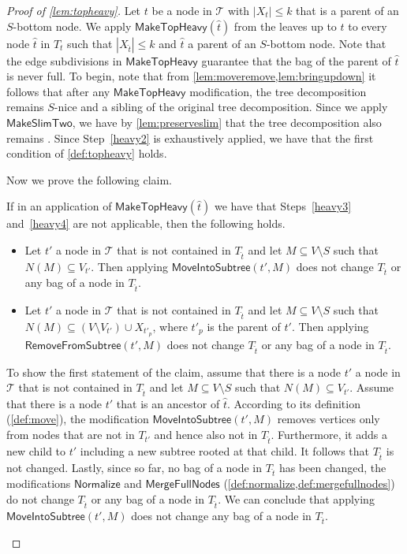 \documentclass[a4paper,UKenglish,cleveref, autoref, thm-restate, numberwithinsect]{lipics-v2021}
\newcounter{modification}
\newcommand{\slim}{\text{slim}\xspace}
\newcommand{\Normalize}{\mathsf{Normalize}}
\newcommand{\MoveIntoSubtree}{\mathsf{MoveIntoSubtree}}
\newcommand{\RemoveFromSubtree}{\mathsf{RemoveFromSubtree}}
\newcommand{\MergeFullNodes}{\mathsf{MergeFullNodes}}
\newcommand{\MakeSlimTwo}{\mathsf{MakeSlimTwo}}
\newcommand{\MakeTopHeavy}{\mathsf{MakeTopHeavy}}
\begin{document}
\begin{proof}[Proof of \cref{lem:topheavy}]
Let $t$ be a node in $\mathcal{T}$ with $|X_t|\le k$ that is a parent of an $S$-bottom node.
We apply $\MakeTopHeavy(\hat{t})$ from the leaves up to $t$ to every node $\hat{t}$ in $T_t$ such that $|X_{\hat{t}}|\le k$ and $\hat{t}$ a parent of an $S$-bottom node. 
Note that the edge subdivisions in $\MakeTopHeavy$ guarantee that the bag of the parent of $\hat{t}$ is never full.
To begin, note that from \cref{lem:moveremove,lem:bringupdown} it follows that after any $\MakeTopHeavy$ modification, the tree decomposition remains $S$-nice and a sibling of the original tree decomposition. Since we apply $\MakeSlimTwo$, we have by \cref{lem:preserveslim} that the tree decomposition also remains \slim. 
Since Step~\ref{heavy2} is exhaustively applied, we have that the first condition of \cref{def:topheavy} holds.

Now we prove the following claim.
\begin{claim}
If in an application of $\MakeTopHeavy(\hat{t})$ 
we have that Steps~\ref{heavy3} and~\ref{heavy4} are not applicable, then the following holds.
\begin{itemize}
\item Let $t'$ a node in $\mathcal{T}$ that is not contained in $T_{\hat{t}}$ and let $M\subseteq V\setminus S$ such that $N(M)\subseteq V_{t'}$. Then applying $\MoveIntoSubtree(t', M)$ does not change $T_{\hat{t}}$ or any bag of a node in $T_{\hat{t}}$.
\item Let $t'$ a node in $\mathcal{T}$ that is not contained in $T_{\hat{t}}$ and let $M\subseteq V\setminus S$ such that $N(M)\subseteq (V\setminus V_{t'})\cup X_{t'_p}$, where $t'_p$ is the parent of $t'$. Then applying $\RemoveFromSubtree(t', M)$ does not change $T_{\hat{t}}$ or any bag of a node in $T_{\hat{t}}$.
\end{itemize}
\end{claim}
\begin{claimproof}
To show the first statement of the claim, assume that there is a node $t'$ a node in $\mathcal{T}$ that is not contained in $T_{\hat{t}}$ and let $M\subseteq V\setminus S$ such that $N(M)\subseteq V_{t'}$.
Assume that there is a node $t'$ that is an ancestor of $\hat{t}$.
According to its definition (\cref{def:move}), the modification $\MoveIntoSubtree(t', M)$ removes vertices only from nodes that are not in $T_{t'}$ and hence also not in $T_{\hat{t}}$. Furthermore, it adds a new child to $t'$ including a new subtree rooted at that child. It follows that $T_{\hat{t}}$ is not changed. Lastly, since so far, no bag of a node in $T_{\hat{t}}$ has been changed, the modifications $\Normalize$ and $\MergeFullNodes$ (\cref{def:normalize,def:mergefullnodes}) do not change $T_{\hat{t}}$ or any bag of a node in $T_{\hat{t}}$. We can conclude that applying $\MoveIntoSubtree(t', M)$ does not change any bag of a node in $T_{\hat{t}}$.


\end{claimproof}
\end{proof}
\end{document}
